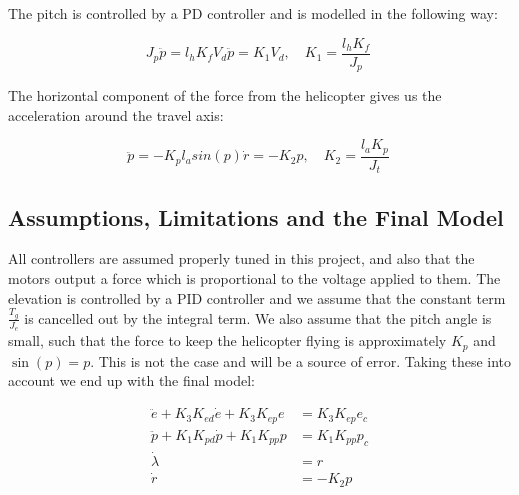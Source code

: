 The pitch is controlled by a PD controller and is modelled in the following way:

\begin{subequations}
\begin{equation}\label{eq:model_pitch1}
J_{p} \ddot{p} = l_{h} K_{f} V_{d}
\end{equation}

\begin{equation}\label{eq:model_pitch2}
\ddot{p} = K_{1} V_{d},\quad K_{1} = \frac{l_{h}K_{f}}{J_{p}}\
\end{equation}
\end{subequations}

The horizontal component of the force from the helicopter gives us the acceleration around the travel axis:

\begin{subequations}
\begin{equation}\label{eq:model_travel1}
\ddot{p} = -K_{p} l_{a} sin(p)
\end{equation}

\begin{equation}\label{eq:model_travel2}
\dot{r} = -K_{2}p,\quad K_{2} = \frac{l_{a}K_{p}}{J_{t}}\
\end{equation}
\end{subequations}

\newpage
\subsection{Assumptions, Limitations and the Final Model}
All controllers are assumed properly tuned in this project, and also that the motors output a force which is proportional to the voltage applied to them. The elevation is controlled by a PID controller and we assume that the constant term \(\frac{T_{g}}{J_{e}}\) is cancelled out by the integral term. We also assume that the pitch angle is small, such that the force to keep the helicopter flying is approximately \(K_{p}\) and \(\sin(p)=p\). This is not the case and will be a source of error. Taking these into account we end up with the final model:

\begin{subequations}\label{eq:model_al}
	\begin{align}
		\ddot{e} + K_{3} K_{ed} \dot{e} + K_{3} K_{ep} e &= K_{3} K_{ep} e_{c} \label{eq:model_se_al_elev} \\
		\ddot{p} + K_{1} K_{pd} \dot{p} + K_{1} K_{pp} p &= K_{1} K_{pp} p_{c} \label{eq:model_se_al_pitch} \\
		\dot{\lambda} &= r \label{eq:model_se_al_lambda} \\
		\dot{r} &= -K_{2} p \label{eq:model_se_al_r} 
	\end{align}
\end{subequations}

